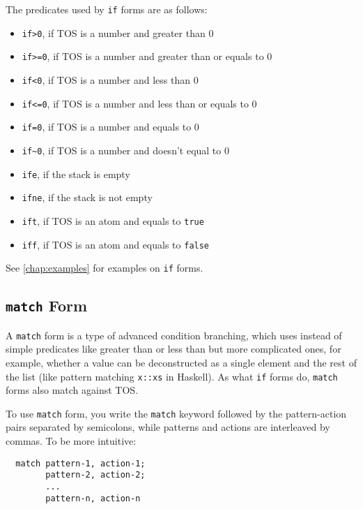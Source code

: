 \documentclass{book}
\begin{document}
The predicates used by \texttt{if} forms are as follows:
\begin{itemize}
\item \texttt{if>0}, if TOS is a number and greater than 0
\item \texttt{if>=0}, if TOS is a number and greater than or equals to 0
\item \texttt{if<0}, if TOS is a number and less than 0
\item \texttt{if<=0}, if TOS is a number and less than or equals to 0
\item \texttt{if=0}, if TOS is a number and equals to 0
\item \texttt{if\textasciitilde 0}, if TOS is a number and doesn't equal to 0
\item \texttt{ife}, if the stack is empty
\item \texttt{ifne}, if the stack is not empty
\item \texttt{ift}, if TOS is an atom and equals to \texttt{true}
\item \texttt{iff}, if TOS is an atom and equals to \texttt{false}
\end{itemize}

See \autoref{chap:examples} for examples on \texttt{if} forms.

\subsection{\texttt{match} Form}

A \texttt{match} form is a type of advanced condition branching, which uses instead of simple predicates like greater than or less than but more complicated ones, for example, whether a value can be deconstructed as a single element and the rest of the list (like pattern matching \texttt{x::xs} in Haskell). As what \texttt{if} forms do, \texttt{match} forms also match against TOS.

To use \texttt{match} form, you write the \texttt{match} keyword followed by the pattern-action pairs separated by semicolons, while patterns and actions are interleaved by commas. To be more intuitive:
\begin{verbatim}
  match pattern-1, action-1;
        pattern-2, action-2;
        ...
        pattern-n, action-n
\end{verbatim}
\end{document}

